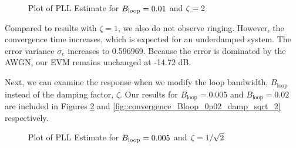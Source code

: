\documentclass{article}
\begin{document}
\begin{figure}[H]
	\centerline{}
	\caption{Plot of PLL Estimate for $\protect{B_\text{loop}} = 0.01$ and $\protect{\zeta = 2}$}
	\label{fig::convergence_Bloop_0p01_damp_2}
\end{figure}

\noindent Compared to results with $\zeta = 1$, we also do not observe ringing. However, the convergence time increases, which is expected for an underdamped system. The error variance $\sigma_e$ increases to 0.596969. Because the error is dominated by the AWGN, our EVM remains unchanged at -14.72 dB.

Next, we can examine the response when we modify the loop bandwidth, $B_\text{loop}$ instead of the damping factor, $\zeta$. Our results for $B_\text{loop} = 0.005$ and $B_\text{loop} = 0.02$ are included in Figures \ref{fig::convergence_Bloop_0p005_damp_sqrt_2} and \ref{fig::convergence_Bloop_0p02_damp_sqrt_2} respectively.

\begin{figure}[H]
	\centerline{}
	\caption{Plot of PLL Estimate for $\protect{B_\text{loop}} = 0.005$ and $\protect{\zeta = 1/\sqrt{2}}$}
	\label{fig::convergence_Bloop_0p005_damp_sqrt_2}
\end{figure}
\end{document}

